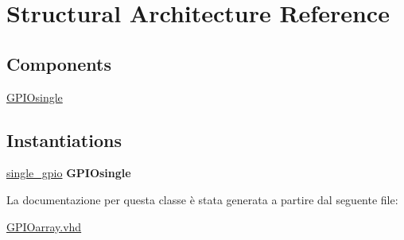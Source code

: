 \hypertarget{class_g_p_i_oarray_1_1_structural}{\section{Structural Architecture Reference}
\label{class_g_p_i_oarray_1_1_structural}
}
\subsection*{Components}
 \begin{DoxyCompactItemize}
\item 
\hypertarget{class_g_p_i_oarray_1_1_structural_ga1ef3f8a153dc3cf7c70b202d716ca7af}{\hyperlink{group___g_p_i_o-array_ga1ef3f8a153dc3cf7c70b202d716ca7af}{G\+P\+I\+Osingle}  {\bfseries }  }\label{class_g_p_i_oarray_1_1_structural_ga1ef3f8a153dc3cf7c70b202d716ca7af}

\end{DoxyCompactItemize}
\subsection*{Instantiations}
 \begin{DoxyCompactItemize}
\item 
\hypertarget{class_g_p_i_oarray_1_1_structural_ada2b130a1b666efc29e68e8f9f429d43}{\hyperlink{class_g_p_i_oarray_1_1_structural_ada2b130a1b666efc29e68e8f9f429d43}{single\+\_\+gpio}  {\bfseries G\+P\+I\+Osingle}   }\label{class_g_p_i_oarray_1_1_structural_ada2b130a1b666efc29e68e8f9f429d43}

\end{DoxyCompactItemize}


La documentazione per questa classe è stata generata a partire dal seguente file\+:\begin{DoxyCompactItemize}
\item 
\hyperlink{_g_p_i_oarray_8vhd}{G\+P\+I\+Oarray.\+vhd}\end{DoxyCompactItemize}
